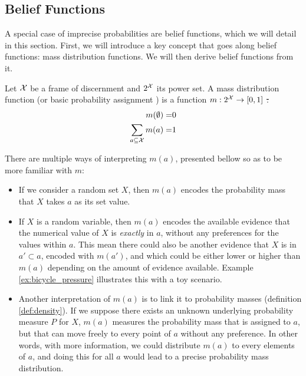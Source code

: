 \subsection{Belief Functions}\label{sec:belief_functions}
A special case of imprecise probabilities are belief functions, which we will detail in this section. First, we will introduce a key concept that goes along belief functions: mass distribution functions. We will then derive belief functions from it.

\begin{definition}
    Let ${\mathcal{X}}$ be a frame of discernment and $2^{\mathcal{X}}$ its power set. A mass distribution function (or basic probability assignment \cite{shafer_mathematical_1976}) is a function $m:2^{\mathcal{X}}\rightarrow[0,1]$ \st:
    \begin{align}
        m(\emptyset) =& 0\label{eq:mass_emptyset}\\
        \sum_{a\subseteq{\mathcal{X}}}m(a) =& 1\label{eq:mass_whole_set}
    \end{align}
\end{definition}

There are multiple ways of interpreting $m(a)$, presented bellow so as to be more familiar with $m$:
\begin{itemize}
    \item If we consider a random set $X$, then $m(a)$ encodes the probability mass that $X$ takes $a$ as its set value.
    \item If $X$ is a random variable, then $m(a)$ encodes the available evidence that the numerical value of $X$ is \textit{exactly} in $a$, without any preferences for the values within $a$. This mean there could also be another evidence that $X$ is in $a'\subset a$, encoded with $m(a')$, and which could be either lower or higher than $m(a)$ depending on the amount of evidence available. Example \ref{ex:bicycle_pressure} illustrates this with a toy scenario. 
    \item Another interpretation of $m(a)$ is to link it to probability masses (definition \ref{def:density}). If we suppose there exists an unknown underlying probability measure $P$ for $X$, $m(a)$ measures the probability mass that is assigned to $a$, but that can move freely to every point of $a$ without any preference. In other words, with more information, we could distribute $m(a)$ to every elements of $a$, and doing this for all $a$ would lead to a precise probability mass distribution.
\end{itemize}


